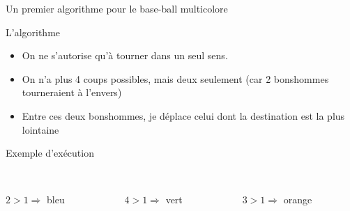 \documentclass[final,hyperref={pdfpagelabels=false}]{beamer}
\renewcommand*{\small}{\fontsize{\resultsmallX}{\resultsmallY}\selectfont}
\begin{document}
\begin{frame}{Un premier algorithme pour le base-ball multicolore}
  \begin{block}{L'algorithme}
    \begin{itemize}
    \item On ne s'autorise qu'à tourner dans un seul sens.
    \item On n'a plus 4 coups possibles, mais deux seulement (car 2 bonshommes
      tourneraient à l'envers)
    \item Entre ces deux bonshommes, je déplace celui dont la destination est la
      plus lointaine
    \end{itemize}
  \end{block}


  \begin{block}{Exemple d'exécution}
    \begin{columns}

      \begin{column}{.15\linewidth}\center
        \\
        {\small $2>1\Rightarrow$ bleu}        
      \end{column}

      \begin{column}{.15\linewidth}\center
        \\
        {\small $4>1\Rightarrow$ vert}        
      \end{column}

      \begin{column}{.15\linewidth}\center
        \\
        {\small $3>1\Rightarrow$ orange}        
      \end{column}


\end{columns}
\end{block}
\end{frame}
\end{document}
